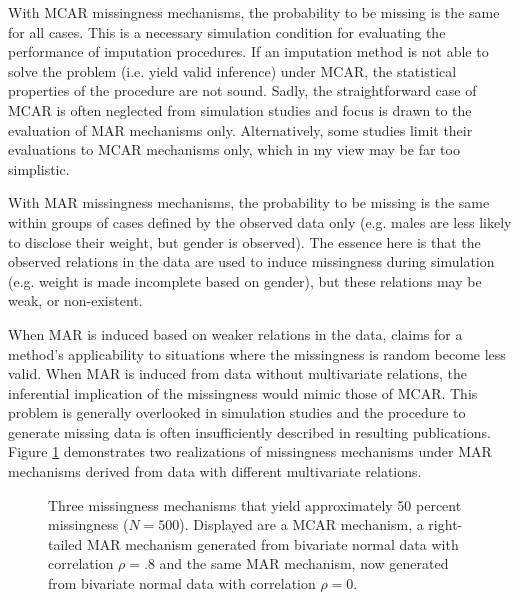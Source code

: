 \documentclass[bimj,fleqn]{w-art}
\begin{document}
With MCAR missingness mechanisms, the probability to be missing is the same for all cases. This is a necessary simulation condition for evaluating the performance of imputation procedures. If an imputation method is not able to solve the problem (i.e. yield valid inference) under MCAR, the statistical properties of the procedure are not sound. Sadly, the straightforward case of MCAR is often neglected from simulation studies and focus is drawn to the evaluation of MAR mechanisms only. Alternatively, some studies limit their evaluations to MCAR mechanisms only, which in my view may be far too simplistic. 

With MAR missingness mechanisms, the probability to be missing is the same within groups of cases defined by the observed data only (e.g. males are less likely to disclose their weight, but gender is observed). The essence here is that the observed relations in the data are used to induce missingness during simulation (e.g. weight is made incomplete based on gender), but these relations may be weak, or non-existent. 

When MAR is induced based on weaker relations in the data, claims for a method's applicability to situations where the missingness is random become less valid. When MAR is induced from data without multivariate relations, the inferential implication of the missingness would mimic those of MCAR. This problem is generally overlooked in simulation studies and the procedure to generate missing data is often insufficiently described in resulting publications. Figure \ref{fig:MAR} demonstrates two realizations of missingness mechanisms under MAR mechanisms derived from data with different multivariate relations. 

\begin{figure}[htb]
\begin{center}
\caption{Three missingness mechanisms that yield approximately 50 percent missingness ($N=500$). Displayed are a MCAR mechanism, a right-tailed MAR mechanism generated from bivariate normal data with correlation $\rho=.8$ and the same MAR mechanism, now generated from bivariate normal data with correlation $\rho= 0$.}
\end{center}
\label{fig:MAR}
\end{figure}
\vspace*{1pc}
\end{document}
